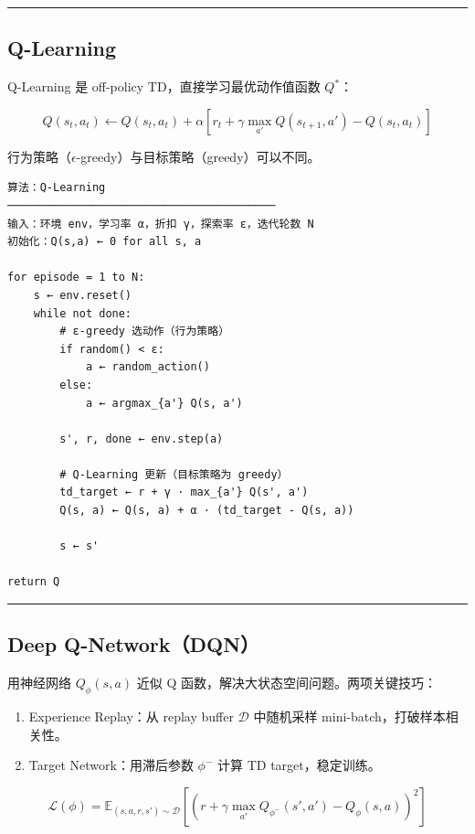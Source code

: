 \hrule

\subsection{Q-Learning}

Q-Learning 是 off-policy TD，直接学习最优动作值函数 \(Q^*\)：

\[
Q(s_t, a_t) \leftarrow Q(s_t, a_t) + \alpha\left[r_t + \gamma \max_{a'} Q(s_{t+1}, a') - Q(s_t, a_t)\right]
\]

行为策略（\(\epsilon\)-greedy）与目标策略（greedy）可以不同。

\begin{verbatim}
算法：Q-Learning
─────────────────────────────────────────
输入：环境 env，学习率 α，折扣 γ，探索率 ε，迭代轮数 N
初始化：Q(s,a) ← 0 for all s, a

for episode = 1 to N:
    s ← env.reset()
    while not done:
        # ε-greedy 选动作（行为策略）
        if random() < ε:
            a ← random_action()
        else:
            a ← argmax_{a'} Q(s, a')
        
        s', r, done ← env.step(a)
        
        # Q-Learning 更新（目标策略为 greedy）
        td_target ← r + γ · max_{a'} Q(s', a')
        Q(s, a) ← Q(s, a) + α · (td_target - Q(s, a))
        
        s ← s'

return Q
\end{verbatim}

\hrule

\subsection{Deep Q-Network（DQN）}

用神经网络 \(Q_\phi(s, a)\) 近似 Q 函数，解决大状态空间问题。两项关键技巧：

\begin{enumerate}
  \item Experience Replay：从 replay buffer \(\mathcal{D}\) 中随机采样 mini-batch，打破样本相关性。
  \item Target Network：用滞后参数 \(\phi^-\) 计算 TD target，稳定训练。
\end{enumerate}

\[
\mathcal{L}(\phi) = \mathbb{E}_{(s,a,r,s') \sim \mathcal{D}}\!\left[\left(r + \gamma \max_{a'} Q_{\phi^-}(s', a') - Q_\phi(s, a)\right)^2\right]
\]

